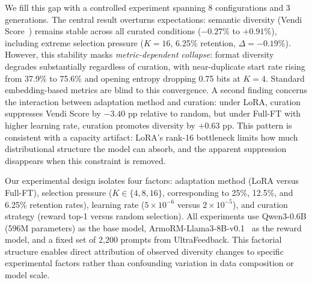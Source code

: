 We fill this gap with a controlled experiment spanning 8 configurations and 3 generations. The central result overturns expectations: semantic diversity (Vendi Score~\cite{placeholder_vendi}) remains stable across all curated conditions ($-0.27\%$ to $+0.91\%$), including extreme selection pressure ($K{=}16$, 6.25\% retention, $\Delta = -0.19\%$). However, this stability masks \emph{metric-dependent collapse}: format diversity degrades substantially regardless of curation, with near-duplicate start rate rising from 37.9\% to 75.6\% and opening entropy dropping 0.75 bits at $K{=}4$. Standard embedding-based metrics are blind to this convergence. A second finding concerns the interaction between adaptation method and curation: under LoRA, curation suppresses Vendi Score by $-3.40$ pp relative to random, but under Full-FT with higher learning rate, curation promotes diversity by $+0.63$ pp. This pattern is consistent with a capacity artifact: LoRA's rank-16 bottleneck limits how much distributional structure the model can absorb, and the apparent suppression disappears when this constraint is removed.

Our experimental design isolates four factors: adaptation method (LoRA versus Full-FT), selection pressure ($K \in \{4, 8, 16\}$, corresponding to 25\%, 12.5\%, and 6.25\% retention rates), learning rate ($5 \times 10^{-6}$ versus $2 \times 10^{-5}$), and curation strategy (reward top-1 versus random selection). All experiments use Qwen3-0.6B (596M parameters) as the base model, ArmoRM-Llama3-8B-v0.1~\cite{placeholder_armorm} as the reward model, and a fixed set of 2{,}200 prompts from UltraFeedback. This factorial structure enables direct attribution of observed diversity changes to specific experimental factors rather than confounding variation in data composition or model scale.

